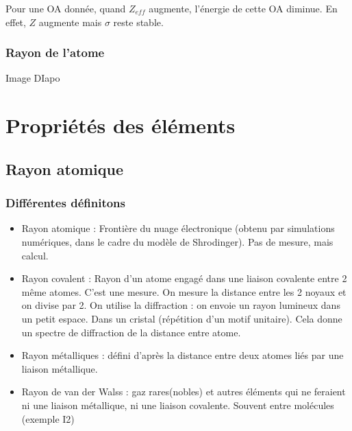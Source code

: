 \documentclass[french]{yLectureNote}
\begin{document}
Pour une OA donnée, quand $Z_{eff}$ augmente, l'énergie de cette OA diminue. En effet, $Z$ augmente mais $\sigma$ reste stable.
\subsubsection{Rayon de l'atome}
Image DIapo
\section{Propriétés des éléments}
\subsection{Rayon atomique}
\subsubsection{Différentes définitons}

\begin{itemize}
 \item Rayon atomique : Frontière du nuage électronique (obtenu par simulations numériques, dans le cadre du modèle de Shrodinger). Pas de mesure, mais calcul.
 \item Rayon covalent : Rayon d'un atome engagé dans une liaison covalente entre 2 m\^eme atomes. C'est une mesure. On mesure la distance entre les 2 noyaux et on divise par 2. On utilise la diffraction : on envoie un rayon lumineux dans un petit espace. Dans un cristal (répétition d'un motif unitaire). Cela donne un spectre de diffraction de la distance entre atome.
 \item Rayon métalliques : défini d’après la distance entre deux
atomes liés par une liaison
métallique.
\item Rayon de van der Walss : gaz rares(nobles) et autres éléments qui ne
feraient ni une liaison métallique, ni une liaison covalente. Souvent entre molécules (exemple I2)
\end{itemize}
\end{document}

